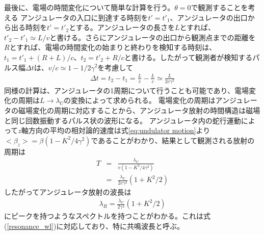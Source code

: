 \documentclass[a4paper,11pt,uplatex]{jsbook}
\begin{document}
最後に、電場の時間変化について簡単な計算を行う。$\theta = 0$で観測することを考える
アンジュレータの入口に到達する時刻を$t' = t'_1 $、アンジュレータの出口から出る時刻を$t' = t'_2$とする。アンジュレータの長さを$L$とすれば、
$t'_2 - t'_1 \simeq L / v$と書ける。さらにアンジュレータの出口から観測点までの距離を$R$とすれば、電場の時間変化の始まりと終わりを検知する時刻は、
$t_1 = t'_1 + (R + L)/c$、$t_2 = t'_2 + R/c$と書ける。したがって観測者が検知するパルス幅$\Delta t$は、$v/c \simeq 1- 1/2\gamma^2$を考慮して
\begin{eqnarray}
  \Delta t = t_2 - t_1 = \frac{L}{v}  - \frac{L}{c} \simeq \frac{L}{2c\gamma^2}
\end{eqnarray}
同様の計算は、アンジュレータの1周期について行うことも可能であり、電場変化の周期は$L\rightarrow \lambda_U$の変換によって求められる。
電場変化の周期はアンジュレータの磁場変化の周期に対応することから、アンジュレータ放射の時間構造は磁場と同じ回数振動するパルス状の波形になる。
アンジュレータ内の蛇行運動によって$z$軸方向の平均の相対論的速度は式\ref{eq:undulator motion}より$<\beta_z> =\beta (1-K^2/4\gamma^2)$であることがわかり、結果として観測される放射の周期は
\begin{eqnarray}
  T &=& \frac{\lambda_U}{v(1-K^2/4\gamma^2)} \\
  &=& \frac{\lambda_U}{2c\gamma^2}(1 + K^2/2)
\end{eqnarray}
したがってアンジュレータ放射の波長は
\begin{eqnarray}
  \lambda_R = \frac{\lambda_U}{2\gamma^2}(1+K^2/2)
\end{eqnarray}\label{eq:resonance_wl}
にピークを持つようなスペクトルを持つことがわかる。これは式(\ref{resonance_wl})に対応しており、特に共鳴波長と呼ぶ。
\end{document}
